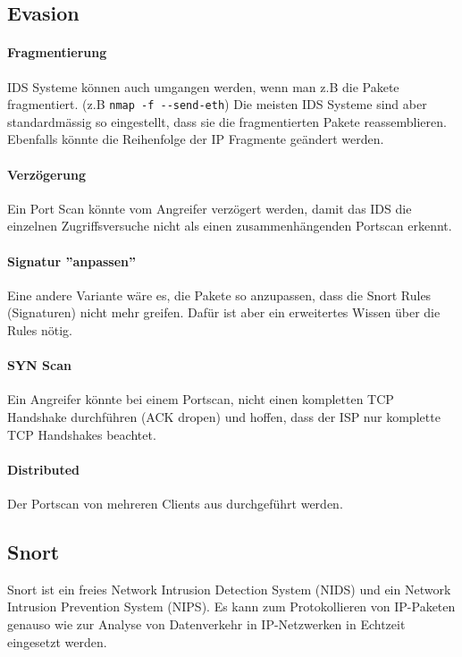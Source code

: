 \subsection{Evasion}
\paragraph{Fragmentierung} IDS Systeme können auch umgangen werden, wenn man z.B die Pakete fragmentiert. (z.B \lstinline|nmap -f --send-eth|) Die meisten IDS Systeme sind aber standardmässig so eingestellt, dass sie die fragmentierten Pakete reassemblieren. Ebenfalls könnte die Reihenfolge der IP Fragmente geändert werden.

\paragraph{Verzögerung} Ein Port Scan könnte vom Angreifer verzögert werden, damit das IDS die einzelnen Zugriffsversuche nicht als einen zusammenhängenden Portscan erkennt.

\paragraph{Signatur ''anpassen''} Eine andere Variante wäre es, die Pakete so anzupassen, dass die Snort Rules (Signaturen) nicht mehr greifen. Dafür ist aber ein erweitertes Wissen über die Rules nötig.

\paragraph{SYN Scan} Ein Angreifer könnte bei einem Portscan,  nicht einen kompletten TCP Handshake durchführen (ACK dropen) und hoffen, dass der ISP nur komplette TCP Handshakes beachtet.

\paragraph{Distributed} Der Portscan von mehreren Clients aus durchgeführt werden.

\clearpage

\subsection{Snort}
Snort ist ein freies Network Intrusion Detection System (NIDS) und ein Network Intrusion Prevention System (NIPS). Es kann zum Protokollieren von IP-Paketen genauso wie zur Analyse von Datenverkehr in IP-Netzwerken in Echtzeit eingesetzt werden. 

